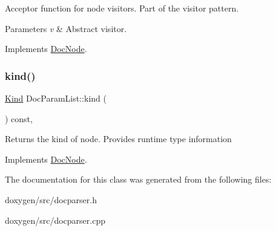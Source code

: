 Acceptor function for node visitors. Part of the visitor pattern. 
\begin{DoxyParams}{Parameters}
{\em v} & Abstract visitor. \\
\hline
\end{DoxyParams}


Implements \mbox{\hyperlink{class_doc_node_a5303a550cbe6395663bf9b9dad28cbf1}{Doc\+Node}}.

\mbox{\label{class_doc_param_list_a455e9aa8d93b2e62376ce37ba1dc1005}} 
\subsubsection{\texorpdfstring{kind()}{kind()}}
{\footnotesize\ttfamily \mbox{\hyperlink{class_doc_node_aebd16e89ca590d84cbd40543ea5faadb}{Kind}} Doc\+Param\+List\+::kind (\begin{DoxyParamCaption}{ }\end{DoxyParamCaption}) const\hspace{0.3cm}{\ttfamily [inline]}, {\ttfamily [virtual]}}

Returns the kind of node. Provides runtime type information 

Implements \mbox{\hyperlink{class_doc_node_a108ffd214a72ba6e93dac084a8f58049}{Doc\+Node}}.



The documentation for this class was generated from the following files\+:\begin{DoxyCompactItemize}
\item 
doxygen/src/docparser.\+h\item 
doxygen/src/docparser.\+cpp\end{DoxyCompactItemize}
